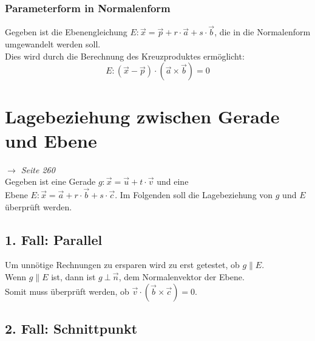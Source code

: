\documentclass[a4paper,12pt]{article}
\begin{document}
\subsubsection{Parameterform in Normalenform}
Gegeben ist die Ebenengleichung $E : \vec{x} = \vec{p} + r \cdot \vec{a} + s \cdot \vec{b}$, die in die Normalenform umgewandelt werden soll.\\
Dies wird durch die Berechnung des Kreuzproduktes ermöglicht:\\
$$E : (\vec{x} - \vec{p}) \cdot (\vec{a} \times \vec{b}) = 0$$
\section{Lagebeziehung zwischen Gerade und Ebene}
\textit{$\rightarrow$ Seite 260}\\
Gegeben ist eine Gerade $g : \vec{x} = \vec{u} + t \cdot \vec{v}$ und eine\\
Ebene $E : \vec{x} = \vec{a} + r \cdot \vec{b} + s \cdot \vec{c}$. Im Folgenden soll die Lagebeziehung von $g$ und $E$ überprüft werden. 
\subsection{1. Fall: Parallel}
Um unnötige Rechnungen zu ersparen wird zu erst getestet, ob $g \parallel E$.\\
Wenn $g \parallel E$ ist, dann ist $g\ \bot\ \vec{n}$, dem Normalenvektor der Ebene.\\
Somit muss überprüft werden, ob $\vec{v} \cdot (\vec{b} \times \vec{c}) = 0$.
\subsection{2. Fall: Schnittpunkt}
\end{document}
